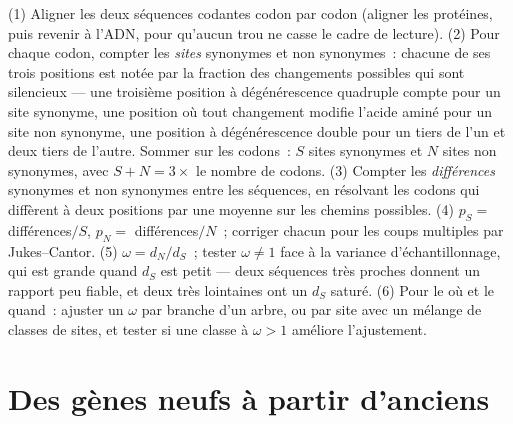 \begin{method}[Estimer $d_{N}/d_{S}$]\label{met:b3:molecular-evolution:method}
(1) Aligner les deux séquences codantes codon par codon (aligner les
protéines, puis revenir à l'ADN, pour qu'aucun trou ne casse le cadre de
lecture). (2) Pour chaque codon, compter les \emph{sites} synonymes et
non synonymes~: chacune de ses trois positions est notée par la fraction
des changements possibles qui sont silencieux --- une troisième position
à dégénérescence quadruple compte pour un site synonyme, une position où
tout changement modifie l'acide aminé pour un site non synonyme, une
position à dégénérescence double pour un tiers de l'un et deux tiers de
l'autre. Sommer sur les codons~: $S$ sites synonymes et $N$ sites non
synonymes, avec $S + N = 3 \times$ le nombre de codons. (3) Compter les
\emph{différences} synonymes et non synonymes entre les séquences, en
résolvant les codons qui diffèrent à deux positions par une moyenne sur
les chemins possibles. (4) $p_{S} = $ différences$/S$,
$p_{N} = $ différences$/N$~; corriger chacun pour les coups multiples par
Jukes--Cantor. (5) $\omega =
d_{N}/d_{S}$~; tester $\omega \ne 1$ face à la variance
d'échantillonnage, qui est grande quand $d_{S}$ est petit --- deux
séquences très proches donnent un rapport peu fiable, et deux très
lointaines ont un $d_{S}$ saturé. (6) Pour le où et le quand~: ajuster un
$\omega$ par branche d'un arbre, ou par site avec un mélange de classes
de sites, et tester si une classe à $\omega > 1$ améliore l'ajustement.
\end{method}

\section{Des gènes neufs à partir d'anciens}


